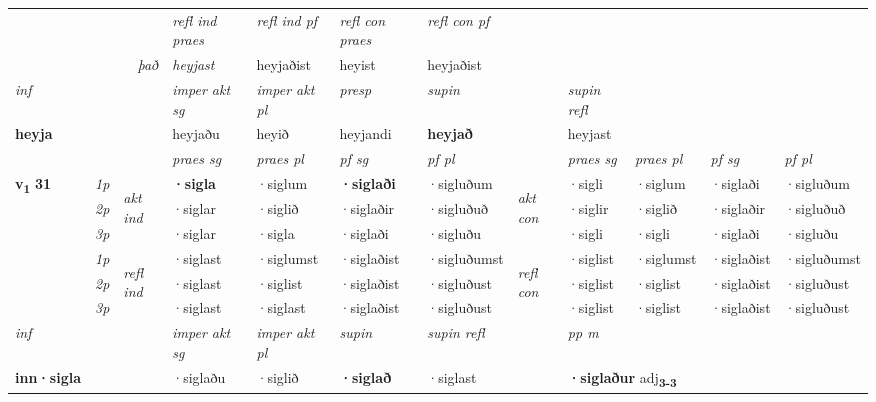 \begin{longtable}[l]{X>{\footnotesize\itshape}llXXXXlXXXX}
 & && \textit{refl ind praes} & \textit{refl ind pf} & \textit{refl con praes} & \textit{refl con pf} \\*
\multicolumn{3}{r}{\textit{það}}& heyjast & heyjaðist & heyist & heyjaðist \\*

\cmidrule{4-7}
   {\textit{inf}} & &  & \textit{imper akt sg} & \textit{imper akt pl}   & \textit{presp} & \textit{supin} && \textit{supin refl}  \\*
  {\textbf{heyja}} & && heyjaðu  & heyið   & heyjandi &  \textbf{heyjað} && heyjast  \\*

\midrule

 & &   & \textit{praes sg}  & \textit{praes pl}    & \textit{ pf sg} & \textit{pf pl} & & \textit{praes sg}  & \textit{praes pl}    & \textit{pf sg} & \textit{pf pl }  \\ \cmidrule{4-7} \cmidrule{9-12}
 \multirow{2}{*}{{{\textbf{v{\textsubscript{1}}} \Large{\textbf{31}}}}}  & 1p & \multirow{3}{*}{\begin{turn}{90}\textit{akt ind}\end{turn}} & \textbf{·sigla} & ·siglum & \textbf{·siglaði} & ·sigluðum & \multirow{3}{*}{\begin{turn}{90}\textit{akt con}\end{turn}} &·sigli & ·siglum & ·siglaði & ·sigluðum\\*
 & 2p &  &  ·siglar  & ·siglið & ·siglaðir & ·sigluðuð & & ·siglir & ·siglið & ·siglaðir & ·sigluðuð \\*
 & 3p &  & ·siglar & ·sigla & ·siglaði & ·sigluðu & & ·sigli & ·sigli& ·siglaði & ·sigluðu \\*
\cmidrule{4-7} \cmidrule{9-12}
 & 1p & \multirow{3}{*}{\begin{turn}{90}\textit{refl ind}\end{turn}}  & ·siglast & ·siglumst & ·siglaðist & ·sigluðumst & \multirow{3}{*}{\begin{turn}{90}\textit{refl con}\end{turn}}  &·siglist & ·siglumst & ·siglaðist & ·sigluðumst \\*
 & 2p &  & ·siglast & ·siglist & ·siglaðist & ·sigluðust & &·siglist & ·siglist & ·siglaðist & ·sigluðust \\*
 & 3p  & & ·siglast & ·siglast & ·siglaðist & ·sigluðust & & ·siglist & ·siglist& ·siglaðist & ·sigluðust \\*
\cmidrule{4-7} \cmidrule{9-12}

   {\textit{inf}} & &  & \textit{imper akt sg} & \textit{imper akt pl}    & \textit{supin} & \textit{supin refl} && \textit{pp m} \\*
  {\textbf{inn\allowbreak ·sigla}} & && ·siglaðu  & ·siglið    &  \textbf{·siglað} & ·siglast && \multicolumn{2}{l}{\textbf{·siglaður} adj\textbf{\textsubscript{3-3}}} \\*


\end{longtable}
